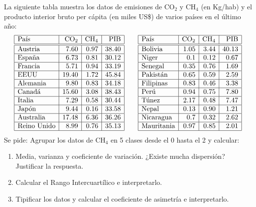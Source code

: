 {La siguiente tabla muestra los datos de emisiones de CO$_2$ y CH$_4$ (en Kg/hab) y el producto interior bruto per cápita (en miles US\$) de varios países en el último año:
\[
\begin{array}{|l|r|r|r|}
\hline
\mbox{País} & \mbox{CO}_2 & \mbox{CH}_4 & \mbox{PIB}\\
\hline\hline
\mbox{Austria}     & 7.60 & 0.97 & 38.40\\ \hline
\mbox{España}      & 6.73 & 0.81	& 30.12\\ \hline
\mbox{Francia}     & 5.71 & 0.94	& 33.19\\ \hline
\mbox{EEUU}        &19.40 & 1.72	&	45.84\\ \hline
\mbox{Alemania}    & 9.80 & 0.83	& 34.18\\ \hline
\mbox{Canadá}      &15.60 & 3.08	& 38.43\\ \hline
\mbox{Italia}      & 7.29 & 0.58	& 30.44\\ \hline
\mbox{Japón}       &	9.44 & 0.16	& 33.58\\ \hline
\mbox{Australia}   &17.48 & 6.36	& 36.26\\ \hline
\mbox{Reino Unido} & 8.99 & 0.76	& 35.13\\ \hline
\end{array}
\qquad
\begin{array}{|l|r|r|r|}
\hline
\mbox{País} & \mbox{CO}_2 & \mbox{CH}_4 & \mbox{PIB}\\
\hline\hline
\mbox{Bolivia}     & 1.05 & 3.44	& 40.13\\ \hline
\mbox{Niger}       &	0.1	 & 0.12	&	 0.67\\ \hline
\mbox{Senegal}     &	0.35 & 0.76 &  1.69\\ \hline
\mbox{Pakistán}    & 0.65 & 0.59	&  2.59\\ \hline
\mbox{Filipinas}   &	0.83 & 0.46	&  3.38\\ \hline
\mbox{Perú}        & 0.94 & 0.75	&  7.80\\ \hline
\mbox{Túnez}      & 2.17 & 0.48	&  7.47\\ \hline
\mbox{Nepal}       & 0.13 & 0.90	&  1.21\\ \hline
\mbox{Nicaragua}   & 0.7	 & 0.32	&  2.62\\ \hline
\mbox{Mauritania}  & 0.97 & 0.85	&  2.01\\ \hline
\end{array}
\]
Se pide:
Agrupar los datos de CH$_4$ en 5 clases desde el 0 hasta el 2 y calcular:
\begin{enumerate}
\item Media, varianza y coeficiente de variación. ¿Existe mucha dispersión? Justificar la respuesta.
\item Calcular el Rango Intercuartílico e interpretarlo.
\item Tipificar los datos y calcular el coeficiente de asimetría e interpretarlo.
\end{enumerate}
}


